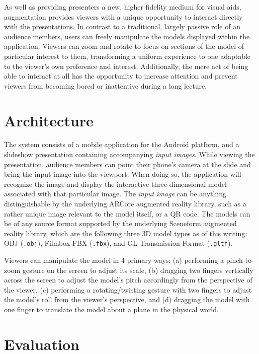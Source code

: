 \documentclass[10pt,journal]{IEEEtran}
\begin{document}
As well as providing presenters a new, higher fidelity medium for visual aids,
augmentation provides viewers with a unique opportunity to interact directly
with the presentations. In contrast to a traditional, largely passive role of
an audience members, users can freely manipulate the models displayed within
the application. Viewers can zoom and rotate to focus on sections of the model
of particular interest to them, transforming a uniform experience to one
adaptable to the viewer's own preference and interest. Additionally, the mere
act of being able to interact at all has the opportunity to increase attention
and prevent viewers from becoming bored or inattentive during a long lecture.


\section{Architecture}

The system consists of a mobile application for the Android platform, and a
slideshow presentation containing accompanying \textit{input images}. While
viewing the presentation, audience members can point their phone's camera at
the slide and bring the input image into the viewport. When doing so, the
application will recognize the image and display the interactive
three-dimensional model associated with that particular image. The
\textit{input image} can be anything distinguishable by the underlying ARCore
augmented reality library, such as a rather unique image relevant to the model
itself, or a QR code. The models can be of any source format supported by the
underlying Sceneform augmented reality library, which are the following three
3D model types as of this writing: OBJ (\texttt{.obj}), Filmbox FBX
(\texttt{.fbx}), and GL Transmission Format (\texttt{.gltf}).

Viewers can manipulate the model in 4 primary ways: (a) performing a
pinch-to-zoom gesture on the screen to adjust its scale, (b) dragging two
fingers vertically across the screen to adjust the model's pitch accordingly
from the perspective of the viewer, (c) performing a rotating/twisting gesture
with two fingers to adjust the model's roll from the viewer's perspective, and
(d) dragging the model with one finger to translate the model about a plane in
the physical world.

\section{Evaluation}
\end{document}
